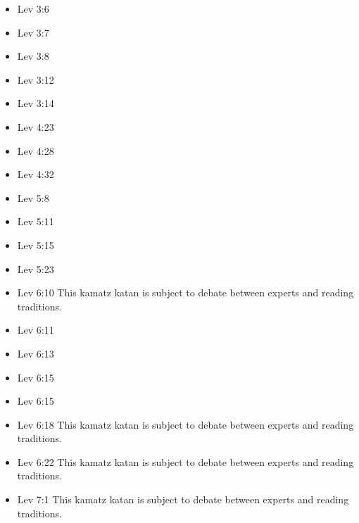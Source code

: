 \documentclass[14pt]{article}
\begin{document}
\begin{multicols}{2}
\begin{itemize}
\item Lev 3:6

\item Lev 3:7

\item Lev 3:8

\item Lev 3:12

\item Lev 3:14

\item Lev 4:23

\item Lev 4:28

\item Lev 4:32

\item Lev 5:8

\item Lev 5:11

\item Lev 5:15

\item Lev 5:23

\item Lev 6:10 This kamatz katan is subject to debate between experts and reading traditions.

\item Lev 6:11

\item Lev 6:13

\item Lev 6:15

\item Lev 6:15

\item Lev 6:18 This kamatz katan is subject to debate between experts and reading traditions.

\item Lev 6:22 This kamatz katan is subject to debate between experts and reading traditions.

\item Lev 7:1 This kamatz katan is subject to debate between experts and reading traditions.


\end{itemize}
\end{multicols}
\end{document}
